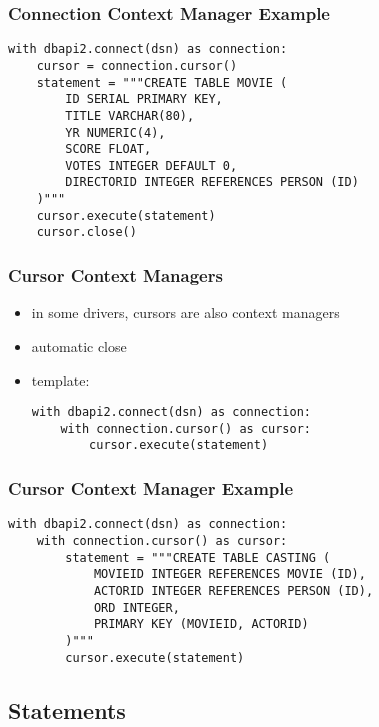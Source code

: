 \documentclass[dvipsnames]{beamer}
\theoremstyle{plain}
\begin{document}
\begin{frame}[fragile]
  \frametitle{Connection Context Manager Example}

  \begin{lstlisting}
with dbapi2.connect(dsn) as connection:
    cursor = connection.cursor()
    statement = """CREATE TABLE MOVIE (
        ID SERIAL PRIMARY KEY,
        TITLE VARCHAR(80),
        YR NUMERIC(4),
        SCORE FLOAT,
        VOTES INTEGER DEFAULT 0,
        DIRECTORID INTEGER REFERENCES PERSON (ID)
    )"""
    cursor.execute(statement)
    cursor.close()
  \end{lstlisting}
\end{frame}

\begin{frame}[fragile]
  \frametitle{Cursor Context Managers}

  \begin{itemize}
    \item in some drivers, cursors are also context managers
    \item automatic close

    \medskip
    \item template:
    \begin{lstlisting}
with dbapi2.connect(dsn) as connection:
    with connection.cursor() as cursor:
        cursor.execute(statement)
    \end{lstlisting}
  \end{itemize}
\end{frame}

\begin{frame}[fragile]
  \frametitle{Cursor Context Manager Example}

  \begin{lstlisting}
with dbapi2.connect(dsn) as connection:
    with connection.cursor() as cursor:
        statement = """CREATE TABLE CASTING (
            MOVIEID INTEGER REFERENCES MOVIE (ID),
            ACTORID INTEGER REFERENCES PERSON (ID),
            ORD INTEGER,
            PRIMARY KEY (MOVIEID, ACTORID)
        )"""
        cursor.execute(statement)
  \end{lstlisting}
\end{frame}

\subsection{Statements}
\end{document}
